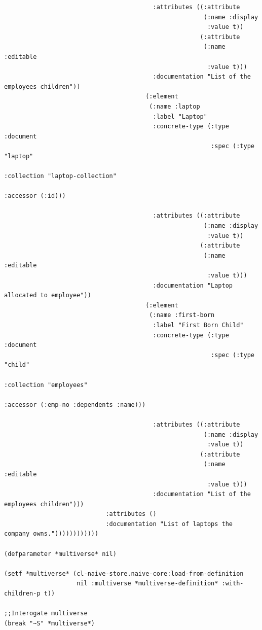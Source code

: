 \documentclass[11pt]{article}
\begin{document}
\begin{verbatim}
                                         :attributes ((:attribute
                                                       (:name :display
                                                        :value t))
                                                      (:attribute
                                                       (:name :editable
                                                        :value t)))
                                         :documentation "List of the employees children"))
                                       (:element
                                        (:name :laptop
                                         :label "Laptop"
                                         :concrete-type (:type :document
                                                         :spec (:type "laptop"
                                                                :collection "laptop-collection"
                                                                :accessor (:id)))

                                         :attributes ((:attribute
                                                       (:name :display
                                                        :value t))
                                                      (:attribute
                                                       (:name :editable
                                                        :value t)))
                                         :documentation "Laptop allocated to employee"))
                                       (:element
                                        (:name :first-born
                                         :label "First Born Child"
                                         :concrete-type (:type :document
                                                         :spec (:type "child"
                                                                :collection "employees"
                                                                :accessor (:emp-no :dependents :name)))

                                         :attributes ((:attribute
                                                       (:name :display
                                                        :value t))
                                                      (:attribute
                                                       (:name :editable
                                                        :value t)))
                                         :documentation "List of the employees children")))
                            :attributes ()
                            :documentation "List of laptops the company owns."))))))))))))

(defparameter *multiverse* nil)

(setf *multiverse* (cl-naive-store.naive-core:load-from-definition
                    nil :multiverse *multiverse-definition* :with-children-p t))

;;Interogate multiverse
(break "~S" *multiverse*)

\end{verbatim}
\end{document}
